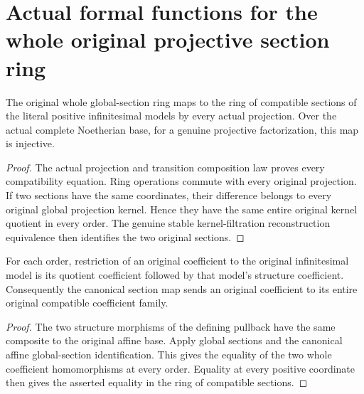 \section{Actual formal functions for the whole original projective section ring}

\begin{theorem}
\label{thm:fibre-projective-original-section-map}
\leanok
The original whole global-section ring maps to the ring of compatible
sections of the literal positive infinitesimal models by every actual
projection. Over the actual complete Noetherian base, for a genuine
projective factorization, this map is injective.
\end{theorem}
\begin{proof}
The actual projection and transition composition law proves every
compatibility equation. Ring operations commute with every original
projection. If two sections have the same coordinates, their difference
belongs to every original global projection kernel. Hence they have the
same entire original kernel quotient in every order. The genuine stable
kernel-filtration reconstruction equivalence then identifies the two
original sections.
\end{proof}

\begin{lemma}
\label{lem:fibre-projective-formal-coefficient}
\leanok
For each order, restriction of an original coefficient to the original
infinitesimal model is its quotient coefficient followed by that model's
structure coefficient. Consequently the canonical section map sends an
original coefficient to its entire original compatible coefficient family.
\end{lemma}
\begin{proof}
The two structure morphisms of the defining pullback have the same
composite to the original affine base. Apply global sections and the
canonical affine global-section identification. This gives the equality
of the two whole coefficient homomorphisms at every order. Equality at
every positive coordinate then gives the asserted equality in the ring
of compatible sections.
\end{proof}

